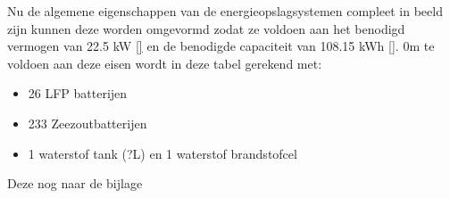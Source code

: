 \noindent Nu de algemene eigenschappen van de energieopslagsystemen compleet in beeld zijn kunnen deze worden omgevormd zodat ze voldoen aan het benodigd vermogen van 22.5 kW \ref{} en de benodigde capaciteit van 108.15 kWh \ref{}. 0m te voldoen aan deze eisen wordt in deze tabel gerekend met:
\begin{itemize}
    \item 26 LFP batterijen
    \item 233 Zeezoutbatterijen
    \item 1 waterstof tank (?L) en 1 waterstof brandstofcel
\end{itemize}

\begin{table}[h]
\centering
\caption{Informatie specifieke energieopslag}
\label{tab:prestatievergelijking_uitgebreid}
\end{table}

Deze nog naar de bijlage

